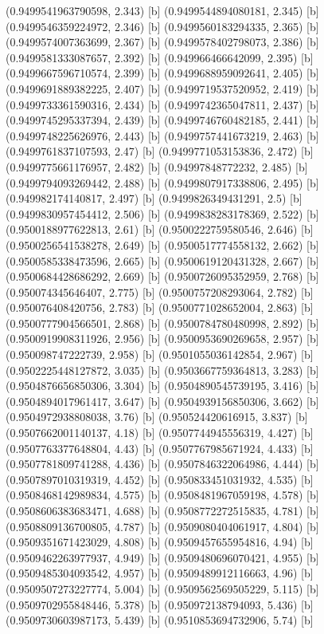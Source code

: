 {{{(0.9499541963790598, 2.343) [b] 
(0.9499544894080181, 2.345) [b] 
(0.9499546359224972, 2.346) [b] 
(0.9499560183294335, 2.365) [b] 
(0.9499574007363699, 2.367) [b] 
(0.9499578402798073, 2.386) [b] 
(0.9499581333087657, 2.392) [b] 
(0.949966466642099, 2.395) [b] 
(0.9499667596710574, 2.399) [b] 
(0.9499688959092641, 2.405) [b] 
(0.9499691889382225, 2.407) [b] 
(0.9499719537520952, 2.419) [b] 
(0.9499733361590316, 2.434) [b] 
(0.9499742365047811, 2.437) [b] 
(0.9499745295337394, 2.439) [b] 
(0.9499746760482185, 2.441) [b] 
(0.9499748225626976, 2.443) [b] 
(0.9499757441673219, 2.463) [b] 
(0.9499761837107593, 2.47) [b] 
(0.9499771053153836, 2.472) [b] 
(0.9499775661176957, 2.482) [b] 
(0.94997848772232, 2.485) [b] 
(0.9499794093269442, 2.488) [b] 
(0.9499807917338806, 2.495) [b] 
(0.949982174140817, 2.497) [b] 
(0.9499826349431291, 2.5) [b] 
(0.9499830957454412, 2.506) [b] 
(0.9499838283178369, 2.522) [b] 
(0.9500188977622813, 2.61) [b] 
(0.9500222759580546, 2.646) [b] 
(0.9500256541538278, 2.649) [b] 
(0.9500517774558132, 2.662) [b] 
(0.9500585338473596, 2.665) [b] 
(0.9500619120431328, 2.667) [b] 
(0.9500684428686292, 2.669) [b] 
(0.9500726095352959, 2.768) [b] 
(0.950074345646407, 2.775) [b] 
(0.9500757208293064, 2.782) [b] 
(0.950076408420756, 2.783) [b] 
(0.9500771028652004, 2.863) [b] 
(0.9500777904566501, 2.868) [b] 
(0.9500784780480998, 2.892) [b] 
(0.9500919908311926, 2.956) [b] 
(0.9500953690269658, 2.957) [b] 
(0.950098747222739, 2.958) [b] 
(0.9501055036142854, 2.967) [b] 
(0.9502225448127872, 3.035) [b] 
(0.9503667759364813, 3.283) [b] 
(0.9504876656850306, 3.304) [b] 
(0.9504890545739195, 3.416) [b] 
(0.9504894017961417, 3.647) [b] 
(0.9504939156850306, 3.662) [b] 
(0.9504972938808038, 3.76) [b] 
(0.950524420616915, 3.837) [b] 
(0.9507662001140137, 4.18) [b] 
(0.9507744945556319, 4.427) [b] 
(0.9507763377648804, 4.43) [b] 
(0.9507767985671924, 4.433) [b] 
(0.9507781809741288, 4.436) [b] 
(0.9507846322064986, 4.444) [b] 
(0.9507897010319319, 4.452) [b] 
(0.950833451031932, 4.535) [b] 
(0.9508468142989834, 4.575) [b] 
(0.9508481967059198, 4.578) [b] 
(0.9508606383683471, 4.688) [b] 
(0.9508772272515835, 4.781) [b] 
(0.9508809136700805, 4.787) [b] 
(0.9509080404061917, 4.804) [b] 
(0.9509351671423029, 4.808) [b] 
(0.9509457655954816, 4.94) [b] 
(0.9509462263977937, 4.949) [b] 
(0.9509480696070421, 4.955) [b] 
(0.9509485304093542, 4.957) [b] 
(0.9509489912116663, 4.96) [b] 
(0.9509507273227774, 5.004) [b] 
(0.9509562569505229, 5.115) [b] 
(0.9509702955848446, 5.378) [b] 
(0.950972138794093, 5.436) [b] 
(0.9509730603987173, 5.439) [b] 
(0.9510853694732906, 5.74) [b] 
}}}
